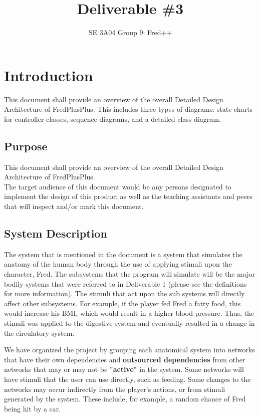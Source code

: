 \documentclass[]{article}
\title{Deliverable \#3}
\author{SE 3A04 Group 9: Fred++}
\date{}
\begin{document}
\maketitle	

\section{Introduction}
\label{sec:introduction}


This document shall provide an overview of the overall Detailed Design Architecture of FredPlusPlus. This includes three types of diagrams: state charts for controller classes, sequence diagrams, and a detailed class diagram.



\subsection{Purpose}
\label{sub:purpose}

This document shall provide an overview of the overall Detailed Design Architecture of FredPlusPlus.\\
The target audience of this document would be any persons designated to implement the design of this product as well as the teaching assistants and peers that will
inspect and/or mark this document.

\subsection{System Description}
\label{sub:system_description}
The system that is mentioned in the document is a system that simulates the anatomy of the human body through the use of applying stimuli upon the character, Fred. The subsystems that the program will simulate will be the major bodily systems that were referred to in Deliverable 1 (please see the definitions for more information). The stimuli that act upon the sub systems will directly affect other subsystems. For example, if the player fed Fred a fatty food, this would increase his BMI, which would result in a higher blood pressure. Thus, the stimuli was applied to the digestive system and eventually resulted in a change in the circulatory system.
	
We have organized the project by grouping each anatomical system into networks that have their own dependencies and \textbf{outsourced dependencies} from other networks that may or may not be \textbf{"active"} in the system. Some networks will have stimuli that
the user can use directly, such as feeding. Some changes to the networks may occur indirectly from the player's actions, or from stimuli generated by the system. These include, for example, a random chance of Fred being hit by a car.
\end{document}
